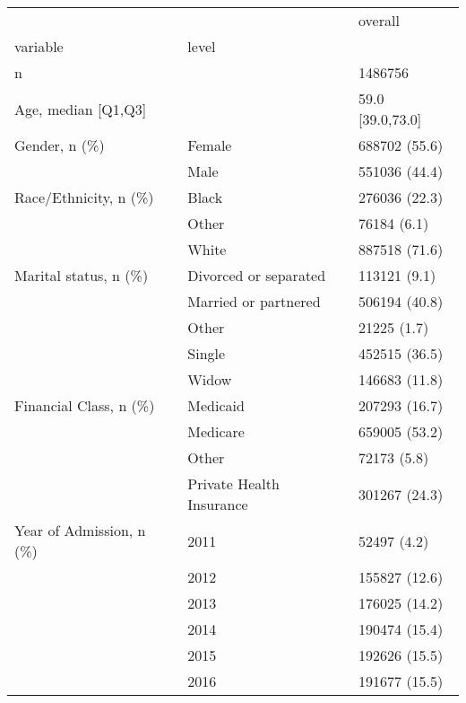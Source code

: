 \begin{tabular}{lll}
\toprule
                                       &   &            overall \\
variable & level &                    \\
\midrule
n &   &            1486756 \\
Age, median [Q1,Q3] &   &   59.0 [39.0,73.0] \\
Gender, n (\%) & Female &      688702 (55.6) \\
                                       & Male &      551036 (44.4) \\
Race/Ethnicity, n (\%) & Black &      276036 (22.3) \\
                                       & Other &        76184 (6.1) \\
                                       & White &      887518 (71.6) \\
Marital status, n (\%) & Divorced or separated &       113121 (9.1) \\
                                       & Married or partnered &      506194 (40.8) \\
                                       & Other &        21225 (1.7) \\
                                       & Single &      452515 (36.5) \\
                                       & Widow &      146683 (11.8) \\
Financial Class, n (\%) & Medicaid &      207293 (16.7) \\
                                       & Medicare &      659005 (53.2) \\
                                       & Other &        72173 (5.8) \\
                                       & Private Health Insurance &      301267 (24.3) \\
Year of Admission, n (\%) & 2011 &        52497 (4.2) \\
                                       & 2012 &      155827 (12.6) \\
                                       & 2013 &      176025 (14.2) \\
                                       & 2014 &      190474 (15.4) \\
                                       & 2015 &      192626 (15.5) \\
                                       & 2016 &      191677 (15.5) \\

\end{tabular}
